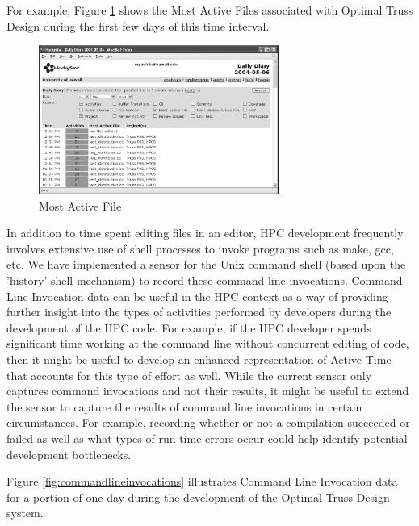 \documentclass[10pt,twocolumn]{article}
\begin{document}
For example, Figure \ref{fig:mostactivefile} shows the Most Active
Files associated with Optimal Truss Design during the first few days
of this time interval.  

\begin{figure}[htpb]
  \centering
  \includegraphics[width=0.70\textwidth]{truss.mostactivefile.eps}
  \caption{Most Active File}
  \label{fig:mostactivefile}
\end{figure}


In addition to time spent editing files in an editor, HPC development
frequently involves extensive use of shell processes to invoke programs
such as make, gcc, etc.  We have implemented a sensor for the Unix command
shell (based upon the 'history' shell mechanism) to record these command
line invocations. Command Line Invocation data can be useful in the HPC
context as a way of providing further insight into the types of activities
performed by developers during the development of the HPC code.  For
example, if the HPC developer spends significant time working at the
command line without concurrent editing of code, then it might be useful to
develop an enhanced representation of Active Time that accounts for this
type of effort as well. While the current sensor only captures command
invocations and not their results, it might be useful to extend the sensor
to capture the results of command line invocations in certain
circumstances. For example, recording whether or not a compilation
succeeded or failed as well as what types of run-time errors occur could
help identify potential development bottlenecks.

Figure \ref{fig:commandlineinvocations} illustrates Command Line Invocation data for 
a portion of one day during the  development of the Optimal Truss Design system.
\end{document}
